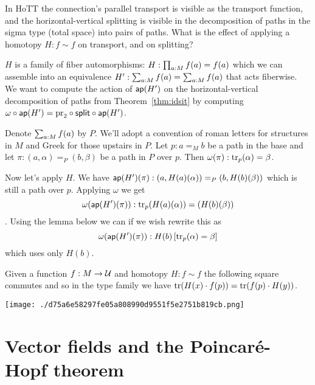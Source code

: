 In HoTT the connection's parallel transport is visible as the transport
function, and the horizontal-vertical splitting is visible in the
decomposition of paths in the sigma type (total space) into pairs of
paths. What is the effect of applying a homotopy \(H:f\sim f\) on
transport, and on splitting?

\(H\) is a family of fiber automorphisms: \(H:\prod_{a:M}f(a)=f(a)\) which
we can assemble into an equivalence \(H':\sum_{a:M}f(a)=\sum_{a:M}f(a)\)
that acts fiberwise. We want to compute the action of \(\mathsf{ap}(H')\) on the
horizontal-vertical decomposition of paths from Theorem~\ref{thm:idsit}
by computing
\(\omega\circ\mathsf{ap}(H')=\mathrm{pr}_2\circ\mathsf{split}\circ\mathsf{ap}(H')\).

Denote \(\sum_{a:M}f(a)\) by \(P\). We'll adopt a convention of roman
letters for structures in \(M\) and Greek for those upstairs in \(P\).
Let \(p:a=_M b\) be a path in the base and let
\(\pi:(a,\alpha)=_P (b,\beta)\) be a path in \(P\) over \(p\). Then
\(\omega(\pi):\mathrm{tr}_p(\alpha)=\beta\).

Now let's apply \(H\). We have
\(\mathsf{ap}(H')(\pi):(a,H(a)(\alpha))=_P(b,H(b)(\beta))\) which is still a
path over \(p\). Applying \(\omega\) we get
\[\omega(\mathsf{ap}(H')(\pi)):\mathrm{tr}_p(H(a)(\alpha))=(H(b)(\beta))\]. Using the
lemma below we can if we wish rewrite this as
\[\omega(\mathsf{ap}(H')(\pi)):H(b)\left[\mathrm{tr}_p(\alpha)=\beta\right]\] which uses
only \(H(b)\).

\begin{mylemma}
Given a function \( f:M\to\mathcal{U} \) and homotopy \( H:f\sim f \) the following square commutes and so in the type family we have \( \mathrm{tr}(H(x)\cdot f(p)) = \mathrm{tr}(f(p)\cdot H(y)) \).
\end{mylemma}

\texttt{[image: ./d75a6e58297fe05a808990d9551f5e2751b819cb.png]}

\section{Vector fields and the Poincaré-Hopf
theorem}\label{vector-fields-and-the-poincaruxe9-hopf-theorem}
